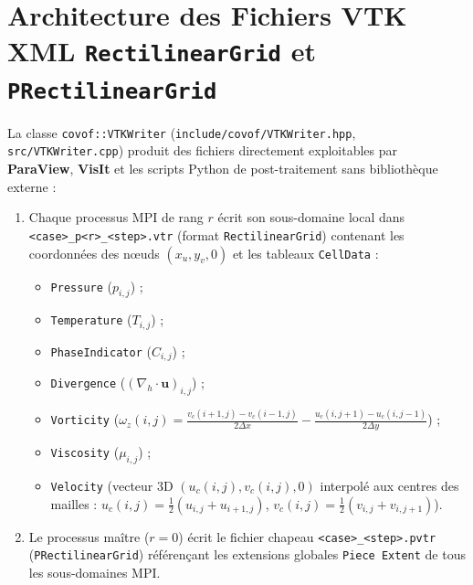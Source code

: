 \documentclass[10pt,a4paper,oneside]{book}
\begin{document}
\section{Architecture des Fichiers VTK XML \texttt{RectilinearGrid} et \texttt{PRectilinearGrid}}
La classe \texttt{covof::VTKWriter} (\texttt{include/covof/VTKWriter.hpp}, \texttt{src/VTKWriter.cpp}) produit des fichiers directement exploitables par \textbf{ParaView}, \textbf{VisIt} et les scripts Python de post-traitement sans bibliothèque externe :
\begin{enumerate}
  \item Chaque processus MPI de rang $r$ écrit son sous-domaine local dans \texttt{<case>\_p<r>\_<step>.vtr} (format \texttt{RectilinearGrid}) contenant les coordonnées des nœuds $(x_u, y_v, 0)$ et les tableaux \texttt{CellData} :
  \begin{itemize}
    \item \texttt{Pressure} ($p_{i,j}$) ;
    \item \texttt{Temperature} ($T_{i,j}$) ;
    \item \texttt{PhaseIndicator} ($C_{i,j}$) ;
    \item \texttt{Divergence} ($(\nabla_h \cdot \mathbf{u})_{i,j}$) ;
    \item \texttt{Vorticity} ($\omega_z(i,j) = \frac{v_{c}(i+1,j)-v_{c}(i-1,j)}{2\Delta x} - \frac{u_{c}(i,j+1)-u_{c}(i,j-1)}{2\Delta y}$) ;
    \item \texttt{Viscosity} ($\mu_{i,j}$) ;
    \item \texttt{Velocity} (vecteur 3D $(u_c(i,j), v_c(i,j), 0)$ interpolé aux centres des mailles : $u_c(i,j) = \frac{1}{2}(u_{i,j} + u_{i+1,j})$, $v_c(i,j) = \frac{1}{2}(v_{i,j} + v_{i,j+1})$).
  \end{itemize}
  \item Le processus maître ($r = 0$) écrit le fichier chapeau \texttt{<case>\_<step>.pvtr} (\texttt{PRectilinearGrid}) référençant les extensions globales \texttt{Piece Extent} de tous les sous-domaines MPI.
\end{enumerate}
\end{document}
